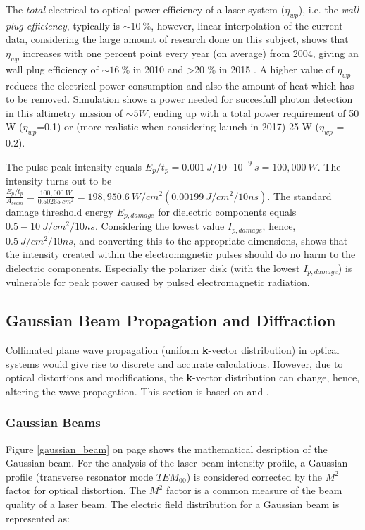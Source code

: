 The \textit{total} electrical-to-optical power efficiency of a laser system ($\eta_{wp}$), i.e. the \textit{wall plug efficiency}, typically is $\sim 10\ \%$, however, linear interpolation of the current data, considering the large amount of research done on this subject, shows that $\eta_{wp}$ increases with one percent point every year (on average) from 2004, giving an wall plug efficiency of $\sim16\ \%$ in 2010 and \textgreater20 \% in 2015 \cite{nd_yag_life}. A higher value of $\eta_{wp}$ reduces the electrical power consumption and also the amount of heat which has to be removed. Simulation shows a power needed for succesfull photon detection in this altimetry mission of $\sim5 W$, ending up with a total power requirement of 50 W ($\eta_{wp}$=0.1) or (more realistic when considering launch in 2017) 25 W ($\eta_{wp}$ = 0.2). 
  
The pulse peak intensity equals $E_{p}/t_{p} = 0.001\ J / 10\cdot10^{-9}\ s = 100,000\ W$. The intensity turns out to be $\frac{E_{p}/t_{p}}{A_{beam}} = \frac{100,000\ W}{0.50265\ cm^{2}} = 198,950.6\ W/cm^{2} (0.00199\ J/cm^{2}/10ns)$. The standard damage threshold energy $E_{p,damage}$ for dielectric components equals $0.5 - 10\ J/cm^{2}/10ns$. Considering the lowest value $I_{p,damage}$, hence, $0.5\ J/cm^{2}/10ns$, and converting this to the appropriate dimensions, shows that the intensity created within the electromagnetic pulses should do no harm to the dielectric components. Especially the polarizer disk (with the lowest $I_{p,damage}$) is vulnerable for peak power caused by pulsed electromagnetic radiation. 

\subsection{Gaussian Beam Propagation and Diffraction}
	\label{diffraction}

Collimated plane wave propagation (uniform \textbf{k}-vector distribution) in optical systems would give rise to discrete and accurate calculations. However, due to optical distortions and modifications, the \textbf{k}-vector distribution can change, hence, altering the wave propagation. This section is based on \cite{fourieroptics} and \cite{fourieroptics1}. 

\subsubsection{Gaussian Beams}
Figure \ref{gaussian_beam} on page \pageref{gaussian_beam} shows the mathematical desription of the Gaussian beam. For the analysis of the \acs{laser} beam intensity profile, a Gaussian profile (transverse resonator mode $TEM_{00}$) is considered corrected by the $M^{2}$ factor for optical distortion. The $M^{2}$ factor is a common measure of the beam quality of a laser beam.  The electric field distribution for a Gaussian beam is represented as:


